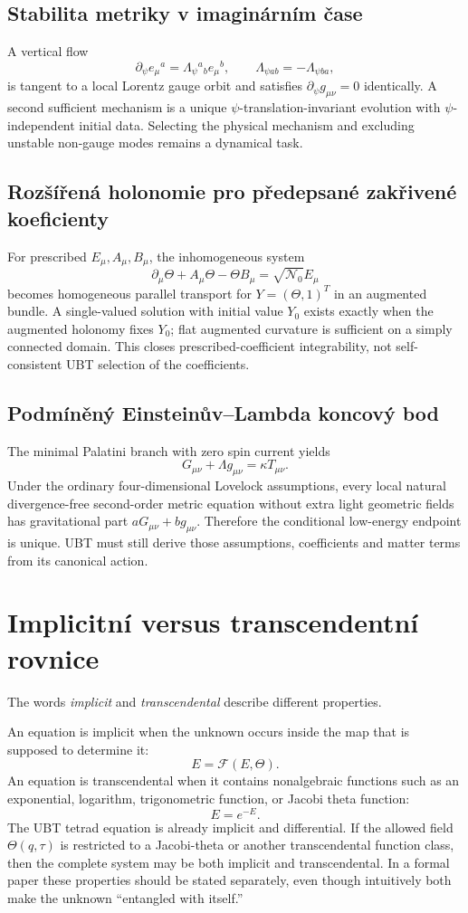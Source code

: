 \subsection{Stabilita metriky v imaginárním čase}
A vertical flow
\[
 \partial_\psi e_\mu{}^a=\Lambda_\psi{}^a{}_b e_\mu{}^b,
 \qquad \Lambda_{\psi ab}=-\Lambda_{\psi ba},
\]
is tangent to a local Lorentz gauge orbit and satisfies
$\partial_\psi g_{\mu\nu}=0$ identically. A second sufficient mechanism is a
unique $\psi$-translation-invariant evolution with $\psi$-independent initial
data. Selecting the physical mechanism and excluding unstable non-gauge modes
remains a dynamical task.

\subsection{Rozšířená holonomie pro předepsané zakřivené koeficienty}
For prescribed $E_\mu,A_\mu,B_\mu$, the inhomogeneous system
\[
 \partial_\mu\Theta+A_\mu\Theta-\Theta B_\mu
 =\sqrt{\mathcal N_0}E_\mu
\]
becomes homogeneous parallel transport for $Y=(\Theta,1)^T$ in an augmented
bundle. A single-valued solution with initial value $Y_0$ exists exactly when
the augmented holonomy fixes $Y_0$; flat augmented curvature is sufficient on
a simply connected domain. This closes prescribed-coefficient integrability,
not self-consistent UBT selection of the coefficients.

\subsection{Podmíněný Einsteinův--Lambda koncový bod}
The minimal Palatini branch with zero spin current yields
\[
 G_{\mu\nu}+\Lambda g_{\mu\nu}=\kappa T_{\mu\nu}.
\]
Under the ordinary four-dimensional Lovelock assumptions, every local natural
divergence-free second-order metric equation without extra light geometric
fields has gravitational part $aG_{\mu\nu}+bg_{\mu\nu}$. Therefore the
conditional low-energy endpoint is unique. UBT must still derive those
assumptions, coefficients and matter terms from its canonical action.

\section{Implicitní versus transcendentní rovnice}
The words \emph{implicit} and \emph{transcendental} describe different
properties.

An equation is implicit when the unknown occurs inside the map that is supposed
to determine it:
\[
 E=\mathcal F(E,\Theta).
\]
An equation is transcendental when it contains nonalgebraic functions such as
an exponential, logarithm, trigonometric function, or Jacobi theta function:
\[
 E=e^{-E}.
\]
The UBT tetrad equation is already implicit and differential.  If the allowed
field $\Theta(q,\tau)$ is restricted to a Jacobi-theta or another transcendental
function class, then the complete system may be both implicit and
transcendental.  In a formal paper these properties should be stated
separately, even though intuitively both make the unknown ``entangled with
itself.''

